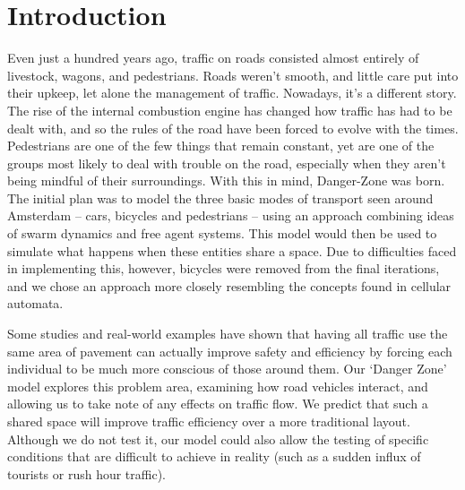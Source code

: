 \chapter{Introduction} \label{chap:introduction}

Even just a hundred years ago, traffic on roads consisted almost entirely of livestock, wagons, and pedestrians. Roads weren’t smooth, and little care put into their upkeep, let alone the management of traffic. Nowadays, it’s a different story. The rise of the internal combustion engine has changed how traffic has had to be dealt with, and so the rules of the road have been forced to evolve with the times. Pedestrians are one of the few things that remain constant, yet are one of the groups most likely to deal with trouble on the road, especially when they aren’t being mindful of their surroundings. With this in mind, Danger-Zone was born. The initial plan was to model the three basic modes of transport seen around Amsterdam – cars, bicycles and pedestrians – using an approach combining ideas of swarm dynamics and free agent systems. This model would then be used to simulate what happens when these entities share a space. Due to difficulties faced in implementing this, however, bicycles were removed from the final iterations, and we chose an approach more closely resembling the concepts found in cellular automata.

Some studies and real-world examples\cite{hamilton2008}\cite{clarke2006}\cite{kruyswijk2016} have shown that having all traffic use the same area of pavement can actually improve safety and efficiency by forcing each individual to be much more conscious of those around them. Our ‘Danger Zone’ model explores this problem area, examining how road vehicles interact, and allowing us to take note of any effects on traffic flow. We predict that such a shared space will improve traffic efficiency over a more traditional layout. Although we do not test it, our model could also allow the testing of specific conditions that are difficult to achieve in reality (such as a sudden influx of tourists or rush hour traffic).

